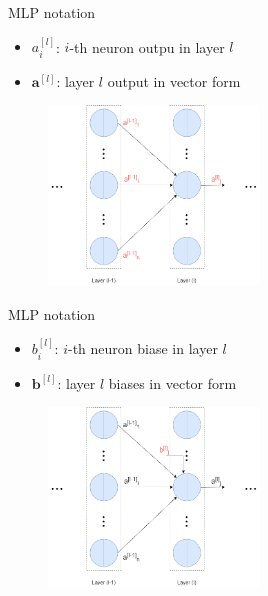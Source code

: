 

\begin{frame}{MLP notation}
    \begin{itemize}
        \item $a^{[l]}_i$: $i$-th neuron outpu in layer $l$
        \item $\bm{a}^{[l]}$: layer $l$ output in vector form
    \end{itemize}
    \begin{figure}[H]
        \centering
        \includegraphics[width=0.5\textwidth]{Figs/notation1.png}
    \end{figure}
\end{frame}

\begin{frame}{MLP notation}
    \begin{itemize}
        \item $b^{[l]}_i$: $i$-th neuron biase in layer $l$
        \item $\bm{b}^{[l]}$: layer $l$ biases in vector form
    \end{itemize}
    \begin{figure}[H]
        \centering
        \includegraphics[width=0.5\textwidth]{Figs/notation1.2.png}
    \end{figure}
\end{frame}

